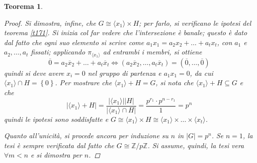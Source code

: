 \documentclass[11pt]{scrartcl}
\theoremstyle{style1}
\newtheorem{teorema}{Teorema}[section]
\numberwithin{equation}{subsection}
\begin{document}
\begin{teorema}
\begin{proof}
Si dimostra, infine, che $G \cong \langle x_1  \rangle\times H $; per farlo, si verificano le ipotesi del teorema \ref{t171}.
Si inizia col far vedere che l'intersezione \`e banale; questo \`e dato dal fatto che ogni suo elemento si scrive come $a_1x_1 = a_2x_2+ \ldots + a_t x_t$, con $a_1$ e $a_2,\ldots,a_t$ fissati; applicando $\pi_{\langle x_1 \rangle} $ ad entrambi i membri, si ottiene
\[
\overline{0} = a_2 \overline{x}_2 + \ldots + a_t \overline{x}_t \iff (a_2 \overline{x}_2,\ldots, a_t \overline{x}_t) = (\overline{0},\ldots,\overline{0})
\] 
quindi si deve avere $x_i = 0$ nel gruppo di partenza e $a_1 x_1=0$, da cui $\langle x_1 \rangle\cap H = \left\{ 0 \right\} $.
Per  mostrare che $\langle x_1 \rangle+  H = G$, si nota che $\langle x_1 \rangle+ H \subseteq G$ e che
\[
\lvert \langle x_1 \rangle+ H  \rvert = \frac{\lvert \langle x_1 \rangle \rvert \lvert H \rvert }{\lvert \langle x_1 \rangle \cap H\rvert } = \frac{p^{r_1} \cdot p^{n-r_1} }{1}=p^n
\] 
quindi le ipotesi sono soddisfatte e $G \cong \langle x_1 \rangle\times H \cong \langle x_1 \rangle \times  \ldots \times\langle x_t \rangle $.

Quanto all'unicit\`a, si procede ancora per induzione su $n$ in $\lvert G \rvert  = p^n$.
Se $n=1$, la tesi \`e sempre verificata dal fatto che $G \cong \mathbb{Z} / p\mathbb{Z}$.
Si assume, quindi, la tesi vera $\forall m < n$ e si dimostra per $n$.


\end{proof}
\end{teorema}
\end{document}
